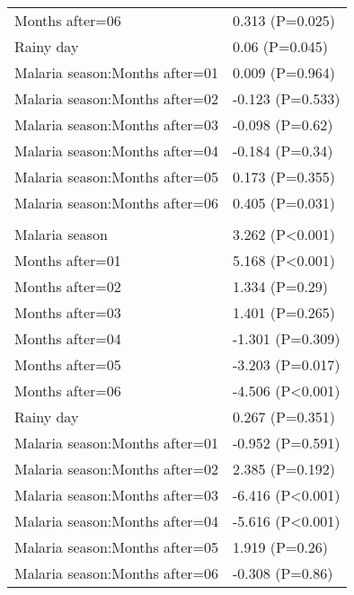 \documentclass[]{article}
\begin{document}
\begin{longtable}[t]{ll}
\hspace{1em}Months after=06 & 0.313 (P=0.025)\\
\hspace{1em}Rainy day & 0.06 (P=0.045)\\
\hspace{1em}Malaria season:Months after=01 & 0.009 (P=0.964)\\
\hspace{1em}Malaria season:Months after=02 & -0.123 (P=0.533)\\
\hspace{1em}Malaria season:Months after=03 & -0.098 (P=0.62)\\
\hspace{1em}Malaria season:Months after=04 & -0.184 (P=0.34)\\
\hspace{1em}Malaria season:Months after=05 & 0.173 (P=0.355)\\
\hspace{1em}Malaria season:Months after=06 & 0.405 (P=0.031)\\
\addlinespace[1.5em]
\multicolumn{2}{l}{\textbf{Temporary not field worker}}\\
\hspace{1em}Malaria season & 3.262 (P<0.001)\\
\hspace{1em}Months after=01 & 5.168 (P<0.001)\\
\hspace{1em}Months after=02 & 1.334 (P=0.29)\\
\hspace{1em}Months after=03 & 1.401 (P=0.265)\\
\hspace{1em}Months after=04 & -1.301 (P=0.309)\\
\hspace{1em}Months after=05 & -3.203 (P=0.017)\\
\hspace{1em}Months after=06 & -4.506 (P<0.001)\\
\hspace{1em}Rainy day & 0.267 (P=0.351)\\
\hspace{1em}Malaria season:Months after=01 & -0.952 (P=0.591)\\
\hspace{1em}Malaria season:Months after=02 & 2.385 (P=0.192)\\
\hspace{1em}Malaria season:Months after=03 & -6.416 (P<0.001)\\
\hspace{1em}Malaria season:Months after=04 & -5.616 (P<0.001)\\
\hspace{1em}Malaria season:Months after=05 & 1.919 (P=0.26)\\
\hspace{1em}Malaria season:Months after=06 & -0.308 (P=0.86)\\*
\end{longtable}
\end{document}
